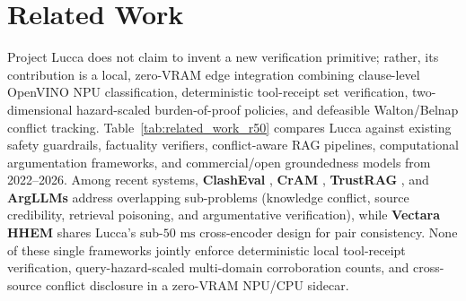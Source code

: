 \documentclass[11pt,a4paper]{article}
\begin{document}
\section{Related Work}
\label{sec:related_work}
Project Lucca does not claim to invent a new verification primitive; rather, its contribution is a local, zero-VRAM edge integration combining clause-level OpenVINO NPU classification, deterministic tool-receipt set verification, two-dimensional hazard-scaled burden-of-proof policies, and defeasible Walton/Belnap conflict tracking. Table~\ref{tab:related_work_r50} compares Lucca against existing safety guardrails, factuality verifiers, conflict-aware RAG pipelines, computational argumentation frameworks, and commercial/open groundedness models from 2022--2026. Among recent systems, \textbf{ClashEval} \cite{wu2024clasheval}, \textbf{CrAM} \cite{deng2024cram}, \textbf{TrustRAG} \cite{zhou2025trustrag}, and \textbf{ArgLLMs} \cite{freedman2024argllms} address overlapping sub-problems (knowledge conflict, source credibility, retrieval poisoning, and argumentative verification), while \textbf{Vectara HHEM} \cite{vectara2024hhem} shares Lucca's sub-$50\text{ ms}$ cross-encoder design for pair consistency. None of these single frameworks jointly enforce deterministic local tool-receipt verification, query-hazard-scaled multi-domain corroboration counts, and cross-source conflict disclosure in a zero-VRAM NPU/CPU sidecar.
\end{document}
